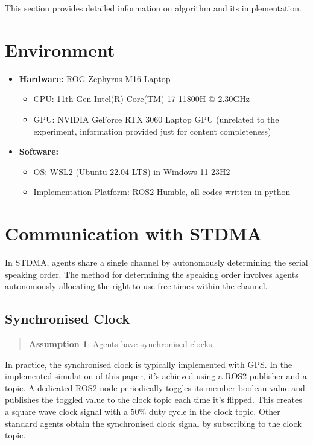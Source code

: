 This section provides detailed information on algorithm and its implementation.

\section*{Environment}

\begin{itemize}
    \item \textbf{Hardware:} ROG Zephyrus M16 Laptop
    \begin{itemize}
        \item CPU: 11th Gen Intel(R) Core(TM) 17-11800H @ 2.30GHz
        \item GPU: NVIDIA GeForce RTX 3060 Laptop GPU (unrelated to the experiment, information provided just for content completeness)
    \end{itemize}
    \item \textbf{Software:}
    \begin{itemize}
        \item OS: WSL2 (Ubuntu 22.04 LTS) in Windows 11 23H2
        \item Implementation Platform: ROS2 Humble, all codes written in python
    \end{itemize}
\end{itemize}

\section{Communication with STDMA}

In STDMA, agents share a single channel by autonomously determining the serial speaking order.
The method for determining the speaking order involves agents autonomously allocating the right to use free times within the channel.


\subsection{Synchronised Clock}

\begin{quotation}
    \textbf{Assumption 1}: 
    Agents have synchronised clocks. 
\end{quotation}

In practice, the synchronised clock is typically implemented with GPS. 
In the implemented simulation of this paper, it's achieved using a ROS2 publisher and a topic.
A dedicated ROS2 node periodically toggles its member boolean value and publishes the toggled value to the clock topic each time it's flipped. This creates a square wave clock signal with a 50\% duty cycle in the clock topic.
Other standard agents obtain the synchronised clock signal by subscribing to the clock topic.

